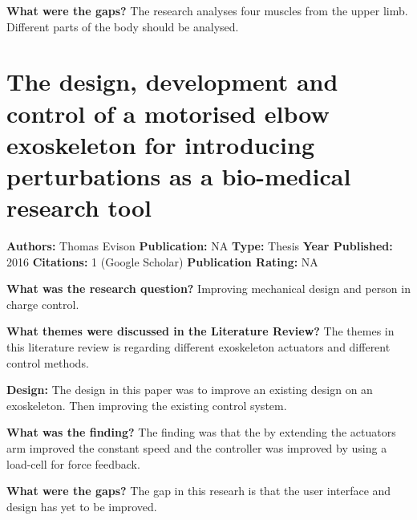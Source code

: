 \textbf{What were the gaps?}   
The research analyses four muscles from the upper limb. Different parts of the body should be analysed. 

\section{The design, development and control of a motorised elbow exoskeleton for introducing perturbations as a bio-medical research tool} 
\textbf{Authors:} Thomas Evison  \newline
\textbf{Publication:} NA
\textbf{Type:} Thesis \newline
\textbf{Year Published:} 2016
\textbf{Citations:} 1 (Google Scholar) \newline 
\textbf{Publication Rating:} NA    

\textbf{What was the research question?}
Improving mechanical design and person in charge control. 

\textbf{What themes were discussed in the Literature Review?} 
The themes in this literature review is regarding different exoskeleton actuators and different control methods.  

\textbf{Design:}  
The design in this paper was to improve an existing design on an exoskeleton. Then improving the existing control system.  

\textbf{What was the finding?} 
The finding was that the by extending the actuators arm improved the constant speed and the controller was improved by using a load-cell for force feedback. 

\textbf{What were the gaps?}  
The gap in this researh is that the user interface and design has yet to be improved. 





